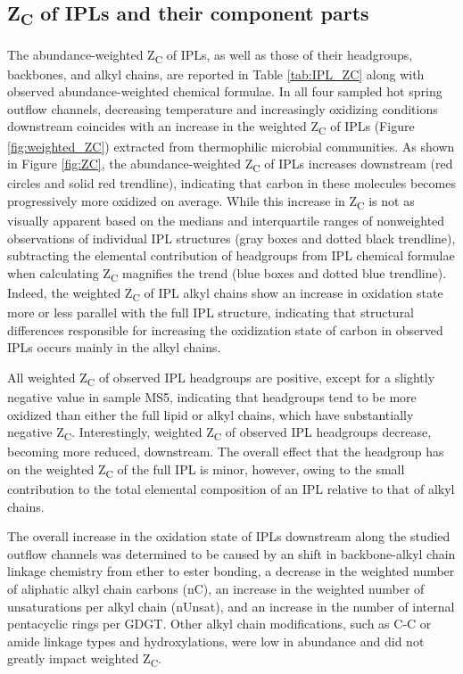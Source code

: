 \subsection{Z\textsubscript{C} of IPLs and their component parts}
The abundance-weighted Z\textsubscript{C} of IPLs, as well as those of their headgroups, backbones, and alkyl chains, are reported in Table \ref{tab:IPL_ZC} along with observed abundance-weighted chemical formulae. In all four sampled hot spring outflow channels, decreasing temperature and increasingly oxidizing conditions downstream coincides with an increase in the weighted Z\textsubscript{C} of IPLs (Figure \ref{fig:weighted_ZC}) extracted from thermophilic microbial communities. As shown in Figure \ref{fig:ZC}, the abundance-weighted Z\textsubscript{C} of IPLs increases downstream (red circles and solid red trendline), indicating that carbon in these molecules becomes progressively more oxidized on average. While this increase in Z\textsubscript{C} is not as visually apparent based on the medians and interquartile ranges of nonweighted observations of individual IPL structures (gray boxes and dotted black trendline), subtracting the elemental contribution of headgroups from IPL chemical formulae when calculating Z\textsubscript{C} magnifies the trend (blue boxes and dotted blue trendline). Indeed, the weighted Z\textsubscript{C} of IPL alkyl chains show an increase in oxidation state more or less parallel with the full IPL structure, indicating that structural differences responsible for increasing the oxidization state of carbon in observed IPLs occurs mainly in the alkyl chains.

All weighted Z\textsubscript{C} of observed IPL headgroups are positive, except for a slightly negative value in sample MS5, indicating that headgroups tend to be more oxidized than either the full lipid or alkyl chains, which have substantially negative Z\textsubscript{C}.
Interestingly, weighted Z\textsubscript{C} of observed IPL headgroups decrease, becoming more reduced, downstream. The overall effect that the headgroup has on the weighted Z\textsubscript{C} of the full IPL is minor, however, owing to the small contribution to the total elemental composition of an IPL relative to that of alkyl chains.

The overall increase in the oxidation state of IPLs downstream along the studied outflow channels was determined to be caused by an shift in backbone-alkyl chain linkage chemistry from ether to ester bonding, a decrease in the weighted number of aliphatic alkyl chain carbons (nC), an increase in the weighted number of unsaturations per alkyl chain (nUnsat), and an increase in the number of internal pentacyclic rings per GDGT. Other alkyl chain modifications, such as C-C or amide linkage types and hydroxylations, were low in abundance and did not greatly impact weighted Z\textsubscript{C}.



